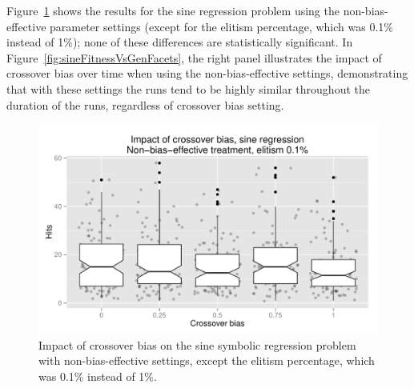 \documentclass{sig-alternate}
\begin{document}
%
%
%
%

%
%
%
%

Figure~\ref{fig:sineBiasResultsWeak} shows the results for the sine regression problem using the non-bias-effective
parameter settings (except for the elitism percentage, which was 0.1\% instead of 1\%); none of these differences are
statistically significant. In Figure~\ref{fig:sineFitnessVsGenFacets}, the right panel illustrates the impact of
crossover bias over time when using the non-bias-effective settings, demonstrating that with these settings the runs
tend to be highly similar throughout the duration of the runs, regardless of crossover bias setting. 


\begin{figure}
\centering
\includegraphics[width=0.45 \textwidth]{Plots/Sine_XO_impact_weak_boxplot.pdf}
\caption{Impact of crossover bias on the sine symbolic regression problem with non-bias-effective settings, 
	except the elitism percentage, which was 0.1\% instead of 1\%.}
\label{fig:sineBiasResultsWeak}
\end{figure}
\end{document}
